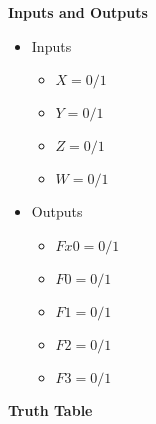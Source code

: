 \textbf{Inputs and Outputs }

\begin{itemize}
\item Inputs

    \begin{itemize}
    
        \item $X = 0 /1 $
    
        \item $Y = 0 /1 $
    
        \item $Z = 0 /1 $
    
        \item $W = 0 /1 $
    
    \end{itemize}
\item Outputs
    \begin{itemize}
    
        \item $Fx0 = 0 /1 $
    
        \item $F0 = 0 /1 $
    
        \item $F1 = 0 /1 $
    
        \item $F2 = 0 /1 $
    
        \item $F3 = 0 /1 $
    
    \end{itemize}
\end{itemize}

\textbf{Truth Table }

